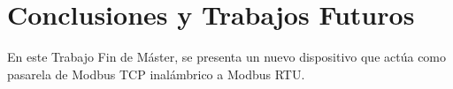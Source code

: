 
\cleardoublepage
\chapter{Conclusiones y Trabajos Futuros}

\label{chap:conclusiones} %

En este Trabajo Fin de Máster, se presenta un nuevo dispositivo que actúa como pasarela de Modbus TCP inalámbrico a Modbus RTU. 

